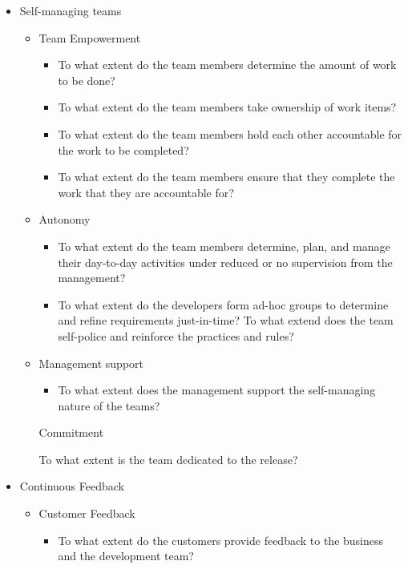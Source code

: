 \begin{appendices}
\begin{itemize}
	\item Self-managing teams
		\begin{itemize}
			\item Team Empowerment
				\begin{itemize}
					\item To what extent do the team members determine the amount of work to be done? 
					\item To what extent do the team members take ownership of work items? 
					\item To what extent do the team members hold each other accountable for the work to be completed? 
					\item To what extent do the team members ensure that they complete the work that they are accountable for?
				\end{itemize}
			\item Autonomy
				\begin{itemize}
					\item To what extent do the team members determine, plan, and manage their day-to-day activities under reduced or no supervision from the management? 
					\item To what extent do the developers form ad-hoc groups to determine and refine requirements just-in-time?
					\addition To what extend does the team self-police and reinforce the practices and rules?
				\end{itemize}
			\item Management support
				\begin{itemize}
					\item To what extent does the management support the self-managing nature of the teams?
				\end{itemize}
			\addition Commitment
				\begin{itemize}
					\addition To what extent is the team dedicated to the release?
				\end{itemize}
		\end{itemize}
	\item Continuous Feedback	
		\begin{itemize}
			\item Customer Feedback
				\begin{itemize}
					\item To what extent do the customers provide feedback to the business and the development team?

\end{itemize}
\end{itemize}
\end{itemize}
\end{appendices}
